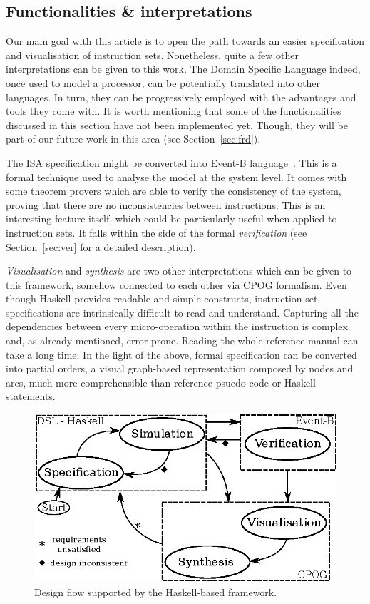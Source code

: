 \documentclass[conference]{IEEEtran}
\begin{document}
\subsection{Functionalities \& interpretations}
\label{sec:func}
Our main goal with this article is to open the path towards an easier specification and
visualisation of instruction sets. Nonetheless, quite a few other interpretations can be
given to this work. The Domain Specific Language indeed, once used to model
a processor, can be potentially translated into other languages. In turn, they
can be progressively employed with the advantages and tools they come with. It is worth
mentioning that some of the functionalities discussed in this section have not been
implemented yet. Though, they will be part of our future work in this area (see 
Section~\ref{sec:frd}).

The ISA specification might be converted into Event-B language~\cite{eventB}. This is a
formal technique used to analyse the model at the system level. It comes with some theorem
provers which are able to verify the consistency of the system, proving that there are 
no inconsistencies between instructions. This is an interesting feature itself, which could
be particularly useful when applied to instruction sets. It falls within the side of the
formal \textit{verification} (see Section~\ref{sec:ver} for a detailed description).

\textit{Visualisation} and \textit{synthesis} are two other
interpretations which can be given to this framework, somehow connected to each other via
CPOG formalism. Even though Haskell provides readable and simple constructs, instruction
set specifications are intrinsically difficult to read and understand.
Capturing all the dependencies between every micro-operation within the instruction is
complex and, as already mentioned, error-prone. Reading the whole reference manual can take
a long time. In the light of the above, formal specification can be converted into partial orders,
a visual graph-based representation composed by nodes and arcs, much more comprehensible 
than reference psuedo-code or Haskell statements.

\begin{figure}[ht!]
\begin{center}
	\includegraphics[width=\linewidth]{IMG/flow.eps}
	\caption{Design flow supported by the Haskell-based framework.}
	\label{fig:flow}
\end{center}
\end{figure}
\end{document}

